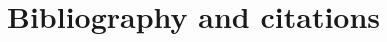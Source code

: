 \documentclass[11pt,a4paper]{article}
\begin{document}
\section{Bibliography and citations}






\end{document}
